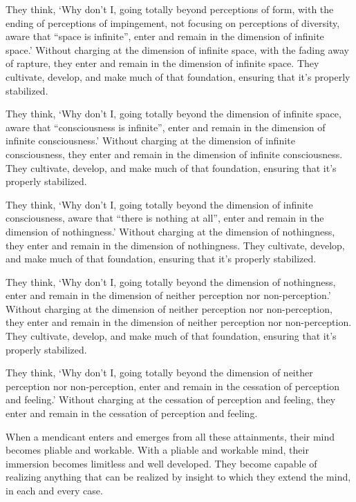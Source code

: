 \documentclass[12pt,openany]{book}%
\begin{document}
They think, ‘Why don’t I, going totally beyond perceptions of form, with the ending of perceptions of impingement, not focusing on perceptions of diversity, aware that “space is infinite”, enter and remain in the dimension of infinite space.’ Without charging at the dimension of infinite space, with the fading away of rapture, they enter and remain in the dimension of infinite space. They cultivate, develop, and make much of that foundation, ensuring that it’s properly stabilized. 

They think, ‘Why don’t I, going totally beyond the dimension of infinite space, aware that “consciousness is infinite”, enter and remain in the dimension of infinite consciousness.’ Without charging at the dimension of infinite consciousness, they enter and remain in the dimension of infinite consciousness. They cultivate, develop, and make much of that foundation, ensuring that it’s properly stabilized. 

They think, ‘Why don’t I, going totally beyond the dimension of infinite consciousness, aware that “there is nothing at all”, enter and remain in the dimension of nothingness.’ Without charging at the dimension of nothingness, they enter and remain in the dimension of nothingness. They cultivate, develop, and make much of that foundation, ensuring that it’s properly stabilized. 

They think, ‘Why don’t I, going totally beyond the dimension of nothingness, enter and remain in the dimension of neither perception nor non-perception.’ Without charging at the dimension of neither perception nor non-perception, they enter and remain in the dimension of neither perception nor non-perception. They cultivate, develop, and make much of that foundation, ensuring that it’s properly stabilized. 

They think, ‘Why don’t I, going totally beyond the dimension of neither perception nor non-perception, enter and remain in the cessation of perception and feeling.’ Without charging at the cessation of perception and feeling, they enter and remain in the cessation of perception and feeling. 

When a mendicant enters and emerges from all these attainments, their mind becomes pliable and workable. With a pliable and workable mind, their immersion becomes limitless and well developed. They become capable of realizing anything that can be realized by insight to which they extend the mind, in each and every case. 
\end{document}
